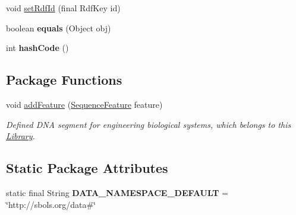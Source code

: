 \begin{DoxyCompactItemize}
void \hyperlink{classorg_1_1sbolstandard_1_1lib_s_b_o_lj_1_1_library_afe8d2a1ced8871ba217ddf364366da99}{setRdfId} (final RdfKey id)
\item 
\hypertarget{classorg_1_1sbolstandard_1_1lib_s_b_o_lj_1_1_library_ae3ce8ca5a04e8966a9d2158aeeecfc16}{
boolean {\bfseries equals} (Object obj)}
\label{classorg_1_1sbolstandard_1_1lib_s_b_o_lj_1_1_library_ae3ce8ca5a04e8966a9d2158aeeecfc16}

\item 
\hypertarget{classorg_1_1sbolstandard_1_1lib_s_b_o_lj_1_1_library_a077e18fe97323c7194e2665ffc766399}{
int {\bfseries hashCode} ()}
\label{classorg_1_1sbolstandard_1_1lib_s_b_o_lj_1_1_library_a077e18fe97323c7194e2665ffc766399}

\end{DoxyCompactItemize}
\subsection*{Package Functions}
\begin{DoxyCompactItemize}
\item 
void \hyperlink{classorg_1_1sbolstandard_1_1lib_s_b_o_lj_1_1_library_a8606f263fb4a3f3d9d7265cf1d1095d3}{addFeature} (\hyperlink{classorg_1_1sbolstandard_1_1lib_s_b_o_lj_1_1_sequence_feature}{SequenceFeature} feature)
\begin{DoxyCompactList}\small\item\em Defined DNA segment for engineering biological systems, which belongs to this \hyperlink{classorg_1_1sbolstandard_1_1lib_s_b_o_lj_1_1_library}{Library}. \item\end{DoxyCompactList}\end{DoxyCompactItemize}
\subsection*{Static Package Attributes}
\begin{DoxyCompactItemize}
\item 
\hypertarget{classorg_1_1sbolstandard_1_1lib_s_b_o_lj_1_1_library_a20b86331ad9418b0c6b737a193b5b051}{
static final String {\bfseries DATA\_\-NAMESPACE\_\-DEFAULT} = \char`\"{}http://sbols.org/data\#\char`\"{}}
\label{classorg_1_1sbolstandard_1_1lib_s_b_o_lj_1_1_library_a20b86331ad9418b0c6b737a193b5b051}

\end{DoxyCompactItemize}


